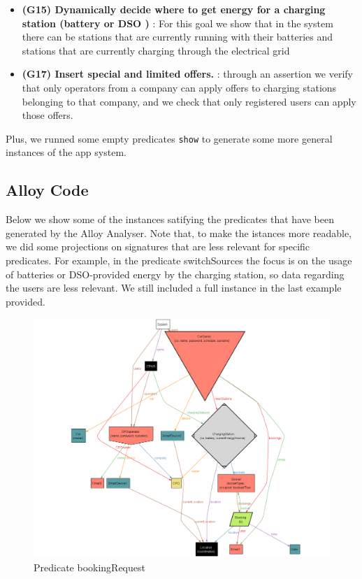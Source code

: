 \documentclass[table, 12pt]{article} %
\begin{document}
\begin{itemize}
        \item \textbf{(G15) Dynamically decide where to get energy for a charging station (battery or DSO ) }: For this goal we show that in the system there can be stations that are currently running with their batteries and stations that are currently charging through the electrical grid 
        \item \textbf{(G17) Insert special and limited offers. }: through an assertion we verify that only operators from a company can apply offers to charging stations belonging to that company, and we check that only registered users can apply those offers.
 
        
    \end{itemize}

    Plus, we runned some empty predicates \texttt{show} to generate some more general instances of the app system.

    \newpage
    \subsection{Alloy Code}
    

    Below we show some of the instances satifying the predicates that have been generated by the Alloy Analyser.
    Note that, to make the istances more readable, we did some projections on signatures that are less relevant for specific predicates. 
    For example, in the predicate switchSources the focus is on the usage of batteries or DSO-provided energy by the charging station, so data regarding the users are less relevant.
    We still included a full instance in the last example provided.

    \begin{center}
        \begin{figure}[H]
            \includegraphics[scale=0.38, center]{assets/alloy/pred_bookingRequest.png}
            \caption{Predicate bookingRequest}
            \label{fig: bookingRequest_alloy}
        \end{figure}
    \end{center}
\end{document}

